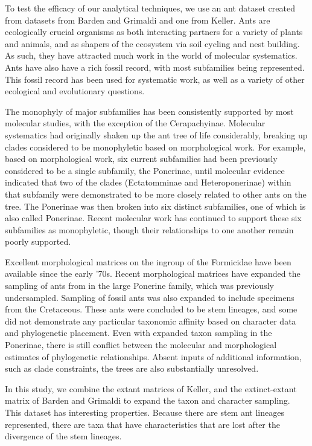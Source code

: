 \documentclass[]{article}
\begin{document}
To test the efficacy of our analytical techniques, we use an ant dataset created from datasets from Barden and Grimaldi and one from Keller.
Ants are ecologically crucial organisms as both interacting partners for a variety of plants and animals, and as shapers of the ecosystem via soil cycling and nest building.
As such, they have attracted much work in the world of molecular systematics.
Ants have also have a rich fossil record, with most subfamilies being represented. 
This fossil record has been used for systematic work, as well as a variety of other ecological and evolutionary questions.\par
The monophyly of major subfamilies has been consistently supported by most molecular studies, with the exception of the Cerapachyinae. 
Molecular systematics had originally shaken up the ant tree of life considerably, breaking up clades considered to be monophyletic based on morphological work.
For example, based on morphological work, six current subfamilies had been previously considered to be a single subfamily, the Ponerinae, until molecular evidence indicated that two of the clades (Ectatomminae and Heteroponerinae) within that subfamily were demonstrated to be more closely related to other ants on the tree.
The Ponerinae was then broken into six distinct subfamilies, one of which is also called Ponerinae. 
Recent molecular work has continued to support these six subfamilies as monophyletic, though their relationships to one another remain poorly supported. \par
Excellent morphological matrices on the ingroup of the Formicidae have been available since the early '70s. 
Recent morphological matrices have expanded the sampling of ants from in the large Ponerine family, which was previously undersampled.
Sampling of fossil ants was also expanded to include specimens from the Cretaceous.
These ants were concluded to be stem lineages, and some did not demonstrate any particular taxonomic affinity based on character data and phylogenetic placement. 
Even with expanded taxon sampling in the Ponerinae, there is still conflict between the molecular and morphological estimates of phylogenetic relationships. 
Absent inputs of additional information, such as clade constraints, the trees are also substantially unresolved. \par
In this study, we combine the extant matrices of Keller, and the extinct-extant matrix of Barden and Grimaldi to expand the taxon and character sampling.  
This dataset has interesting properties.
Because there are stem ant lineages represented, there are taxa that have characteristics that are lost after the divergence of the stem lineages.
\end{document}
